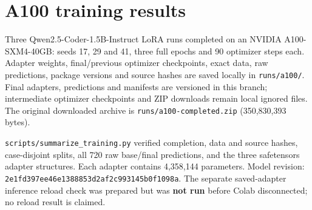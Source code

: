 \documentclass[
  11pt,
  a4paper,
]{article}
\begin{document}
\clearpage

\section{A100 training results}\label{a100-training-results}

Three Qwen2.5-Coder-1.5B-Instruct LoRA runs completed on an NVIDIA
A100-SXM4-40GB: seeds 17, 29 and 41, three full epochs and 90 optimizer
steps each. Adapter weights, final/previous optimizer checkpoints, exact
data, raw predictions, package versions and source hashes are saved
locally in \texttt{runs/a100/}. Final adapters, predictions and
manifests are versioned in this branch; intermediate optimizer
checkpoints and ZIP downloads remain local ignored files. The original
downloaded archive is \texttt{runs/a100-completed.zip} (350,830,393
bytes).

\texttt{scripts/summarize\_training.py} verified completion, data and
source hashes, case-disjoint splits, all 720 raw base/final predictions,
and the three safetensors adapter structures. Each adapter contains
4,358,144 parameters. Model revision:
\nolinkurl{2e1fd397ee46e1388853d2af2c993145b0f1098a}. The separate
saved-adapter inference reload check was prepared but was \textbf{not
run} before Colab disconnected; no reload result is claimed.
\end{document}
